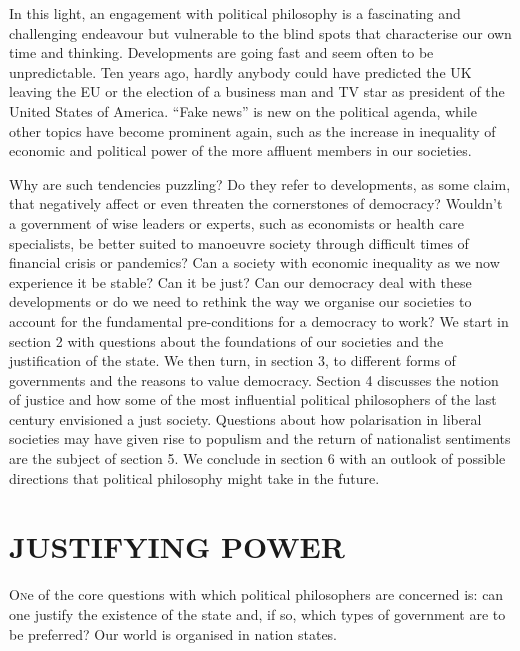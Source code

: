 \documentclass[11pt]{article}
\begin{document}
In this light, an engagement with political philosophy is a fascinating and challenging endeavour but vulnerable to the blind spots that characterise our own time and thinking. Developments are going fast and seem often to be unpredictable. Ten years ago, hardly anybody could have predicted the UK leaving the EU or the election of a business man and TV star as president of the United States of America. “Fake news” is new on the political agenda, while other topics have become prominent again, such as the increase in inequality of economic and political power of the more affluent members in our societies.

Why are such tendencies puzzling? Do they refer to developments, as some claim, that negatively affect or even threaten the cornerstones of democracy?
Wouldn’t a government of wise leaders or experts, such as economists or health care specialists, be better suited to manoeuvre society through difficult times of financial crisis or pandemics? Can a society with economic inequality as we now experience it be stable? Can it be just? Can our democracy deal with these developments or do we need to rethink the way we organise our societies to account for the fundamental pre-conditions for a democracy to work?
We start in section 2 with questions about the foundations of our societies and the justification of the state. We then turn, in section 3, to different forms of governments and the reasons to value democracy. Section 4 discusses the notion of justice and how some of the most influential political philosophers of the last century envisioned a just society. Questions about how polarisation in liberal societies may have given rise to populism and the return of nationalist sentiments are the subject of section 5. We conclude in section 6 with an outlook of possible directions that political philosophy might take in the future.

\section{ JUSTIFYING POWER}
\lettrine[lines=3]{O}ne of the core questions with which political philosophers are concerned is: can one justify the existence of the state and, if so, which types of government are to be preferred? Our world is organised in nation states.
\end{document}
